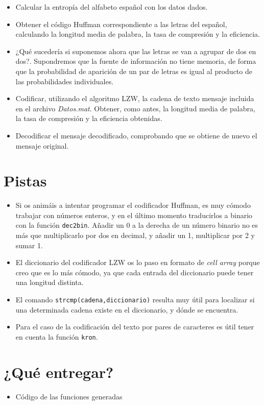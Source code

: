 \documentclass[es,practica]{uah}
\begin{document}
\begin{enumerate}
\begin{itemize}
	\item Calcular la entropía del alfabeto español con los datos dados.
	\item Obtener el código Huffman correspondiente a las letras del español, calculando la longitud media de palabra, la tasa de compresión y la eficiencia.
	\item ¿Qué sucedería si suponemos ahora que las letras se van a agrupar de dos en dos?. Supondremos que la fuente de información no tiene memoria, de forma que la probabilidad de aparición de un par de letras es igual al producto de las probabilidades individuales.
	\item Codificar, utilizando el algoritmo LZW, la cadena de texto mensaje incluida en el archivo \emph{Datos.mat}. Obtener, como antes, la longitud media de palabra, la tasa de compresión y la eficiencia obtenidas.
	\item Decodificar el mensaje decodificado, comprobando que se obtiene de nuevo el mensaje original.
\end{itemize}


\end{enumerate}


\section{Pistas}
\begin{itemize}
	\item Si os animáis a intentar programar el codificador Huffman, es muy cómodo trabajar con números enteros, y en el último momento traducirlos a binario con la función \texttt{dec2bin}. Añadir un 0 a la derecha de un número binario no es más que multiplicarlo por dos en decimal, y añadir un 1, multiplicar por 2 y sumar 1.
	\item El diccionario del codificador LZW os lo paso en formato de \emph{cell array} porque creo que es lo más cómodo, ya que cada entrada del diccionario puede tener una longitud distinta.
	\item El comando \texttt{strcmp(cadena,diccionario)} resulta muy útil para localizar si una determinada cadena existe en el diccionario, y dónde se encuentra.
	\item Para el caso de la codificación del texto por pares de caracteres es útil tener en cuenta la función \texttt{kron}.
\end{itemize}



\section{¿Qué entregar?}
\begin{itemize}
	\item Código de las funciones generadas
\end{itemize}
\end{document}
